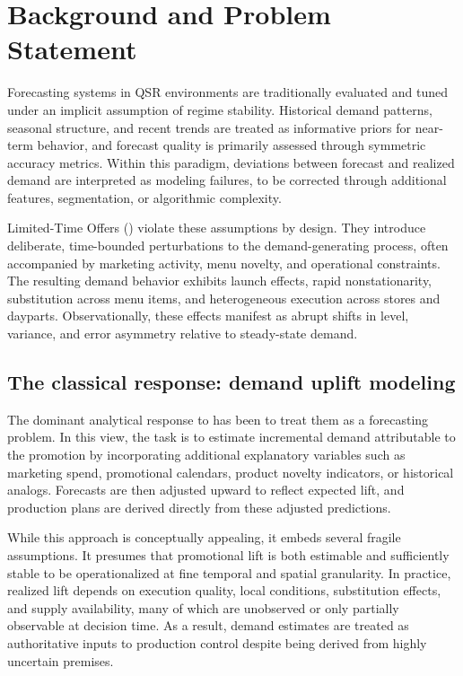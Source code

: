 
\section{Background and Problem Statement}
\label{sec:background-problem}

Forecasting systems in QSR environments are traditionally evaluated and tuned under an implicit
assumption of regime stability. Historical demand patterns, seasonal structure, and recent trends
are treated as informative priors for near-term behavior, and forecast quality is primarily assessed
through symmetric accuracy metrics. Within this paradigm, deviations between forecast and
realized demand are interpreted as modeling failures, to be corrected through additional features,
segmentation, or algorithmic complexity.

Limited-Time Offers (\LTOs{}) violate these assumptions by design. They introduce deliberate,
time-bounded perturbations to the demand-generating process, often accompanied by marketing
activity, menu novelty, and operational constraints. The resulting demand behavior exhibits launch
effects, rapid nonstationarity, substitution across menu items, and heterogeneous execution across
stores and dayparts. Observationally, these effects manifest as abrupt shifts in level, variance, and
error asymmetry relative to steady-state demand.

\subsection{The classical response: demand uplift modeling}
\label{subsec:classical-response}

The dominant analytical response to \LTOs{} has been to treat them as a forecasting problem. In this
view, the task is to estimate incremental demand attributable to the promotion by incorporating
additional explanatory variables such as marketing spend, promotional calendars, product novelty
indicators, or historical analogs. Forecasts are then adjusted upward to reflect expected lift, and
production plans are derived directly from these adjusted predictions.

While this approach is conceptually appealing, it embeds several fragile assumptions. It presumes
that promotional lift is both estimable and sufficiently stable to be operationalized at fine temporal
and spatial granularity. In practice, realized lift depends on execution quality, local conditions,
substitution effects, and supply availability, many of which are unobserved or only partially
observable at decision time. As a result, demand estimates are treated as authoritative inputs to
production control despite being derived from highly uncertain premises.


